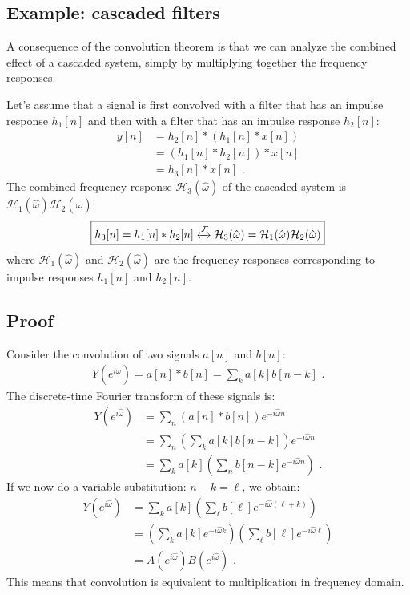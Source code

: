 \subsection{Example: cascaded filters}

A consequence of the convolution theorem is that we can analyze the
combined effect of a cascaded system, simply by multiplying together
the frequency responses.

Let's assume that a signal is first convolved with a filter that has
an impulse response $h_1[n]$ and then with a filter that has an
impulse response $h_2[n]$:
\begin{align}
    y[n] & = h_2[n]*(h_1[n]*x[n]) \\
         & = (h_1[n]*h_2[n])*x[n] \\
         & = h_3[n]*x[n]\,\,.
\end{align}
The combined frequency response $\mathcal{H}_3(\hat{\omega})$ of the
cascaded system is $\mathcal{H}_1(\hat{\omega})\mathcal{H}_2(\hat{\omega})$:
\begin{equation}
    \boxed{
    h_3[n]=h_1[n]*h_2[n] \xleftrightarrow{\mathcal{F}} \mathcal{H}_3(\hat{\omega}) = \mathcal{H}_1(\hat{\omega})\mathcal{H}_2(\hat{\omega})
    }
\end{equation}
where $\mathcal{H}_1(\hat{\omega})$ and $\mathcal{H}_2(\hat{\omega})$
are the frequency responses corresponding to impulse responses
$h_1[n]$ and $h_2[n]$.

    \subsection*{Proof}
    Consider the convolution of two signals $a[n]$ and $b[n]$:
    \begin{align}
        Y(e^{i\hat{\omega}}) = a[n]*b[n] = \sum_k a[k] b[n-k]\,\,.
    \end{align}
    The discrete-time Fourier transform of these signals is:
    \begin{align}
        Y(e^{i\hat{\omega}}) & = \sum_n (a[n]*b[n]) e^{-i\hat{\omega}n}                          \\
                             & = \sum_n \left(\sum_k a[k]b[n-k]\right) e^{-i\hat{\omega}n}       \\
                             & = \sum_k a[k] \left(\sum_n b[n-k] e^{-i\hat{\omega}n}\right)\,\,.
    \end{align}
    If we now do a variable substitution: $n-k=\ell$, we obtain:
    \begin{align}
        Y(e^{i\hat{\omega}}) & = \sum_k a[k] \left(\sum_\ell b[\ell] e^{-i\hat{\omega}(\ell+k)}\right)                              \\
                             & = \left(\sum_k a[k] e^{-i\hat{\omega}k}\right) \left(\sum_\ell b[\ell] e^{-i\hat{\omega}\ell}\right) \\
                             & = A(e^{i\hat{\omega}})B(e^{i\hat{\omega}})\,\,.
    \end{align}
    This means that convolution is equivalent to multiplication in frequency domain.

